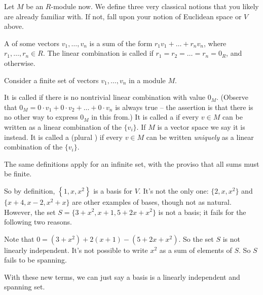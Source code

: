 Let $M$ be an $R$-module now.
We define three very classical notions that you likely are already familiar with.
If not, fall upon your notion of Euclidean space or $V$ above.
\begin{definition}
	A  of some vectors $v_1, \dots, v_n$
	is a sum of the form $r_1 v_1 + \dots + r_n v_n$,
	where $r_1, \dots, r_n \in R$.
	The linear combination is called 
	if $r_1 = r_2 = \dots = r_n = 0_R$, and  otherwise.
\end{definition}
\begin{definition}
	Consider a finite set of vectors $v_1, \dots, v_n$ in a module $M$.
	\begin{itemize}
		\ii It is called  if there
		is no nontrivial linear combination with value $0_M$.
		(Observe that $0_M = 0 \cdot v_1 + 0 \cdot v_2 + \dots + 0 \cdot v_n$
		is always true -- the assertion is that there is no other
		way to express $0_M$ in this from.)
		\ii It is called a  if every $v \in M$ can be written as
		a linear combination of the $\{v_i\}$.
		If $M$ is a vector space we say it is  instead.
		\ii It is called a  (plural )
		if every $v \in M$ can be written
		\emph{uniquely} as a linear combination of the $\{v_i\}$.
	\end{itemize}
	The same definitions apply for an infinite set, with the proviso
	that all sums must be finite.

\end{definition}
So by definition, $\left\{ 1,x,x^2 \right\}$ is a basis for $V$.
It's not the only one: $\{2, x, x^2\}$ and $\{x+4, x-2, x^2+x\}$
are other examples of bases, though not as natural.
However, the set $S = \{3+x^2, x+1, 5+2x+x^2\}$ is not a basis;
it fails for the following two reasons.
\begin{itemize}
	\ii Note that
	$0 = (3+x^2) + 2(x+1) - (5+2x+x^2)$.
	So the set $S$ is not linearly independent.
	\ii It's not possible to write $x^2$ as a sum of elements of $S$.
	So $S$ fails to be spanning.
\end{itemize}
With these new terms, we can just say a basis is a linearly independent and spanning set.

